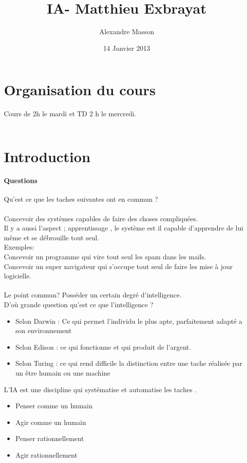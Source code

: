 \documentclass{article}
\title{IA- Matthieu Exbrayat}
\author{Alexandre Masson}
\date{14 Janvier 2013}
\begin{document}
\maketitle
\newpage
\tableofcontents
\newpage
\section{Organisation du cours}
\paragraph{} Cours de 2h le mardi et TD 2 h le mercredi.\\\\
\section{Introduction}
\paragraph{Questions} Qu'est ce que les taches suivantes ont en commun ?\\\\
Concevoir des systèmes capables de faire des choses compliquées.\\Il y a aussi l'aspect ; apprentissage , le système est il capable d'apprendre de lui même et se débrouille tout seul.\\Exemples:\\Concevoir un programme qui vire tout seul les spam dans les mails.\\Concevoir un super navigateur qui s'occupe tout seul de faire les mise à jour logicielle.\\\\Le point commun? Posséder un certain degré d'intelligence.\\D'où grande question qu'est ce que l'intelligence ? 
\begin{itemize}
\item Selon Darwin : Ce qui permet l'individu le plus apte, parfaitement adapté a son environnement
\item Selon Edison : ce qui fonctionne et qui produit de l'argent. 
\item Selon Turing : ce qui rend difficile la distinction entre une tache réalisée par un être humain ou une machine
\end{itemize}
L'IA est une discipline qui systématise et automatise les taches .
\begin{itemize}
\item Penser comme un humain
\item Agir comme un humain
\item Penser rationnellement
\item Agir rationnellement
\end{itemize}
\end{document}
